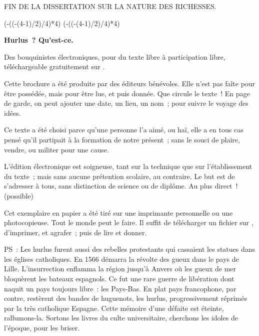 \documentclass[french,twoside]{book} %
\newcommand\chapterclose{} %
\def\truncdiv#1#2{((#1-(#2-1)/2)/#2)}
\def\moduloop#1#2{(#1-\truncdiv{#1}{#2}*#2)}
\def\modulo#1#2{\number\numexpr\moduloop{#1}{#2}\relax}
\begin{document}
\begin{raggedleft}FIN DE LA DISSERTATION SUR LA NATURE DES RICHESSES.\end{raggedleft}
\chapterclose

 


\ifbooklet
  \pagestyle{empty}
  \clearpage
  \ifnum\modulo{\value{page}}{4}=0 \hbox{}\newpage\hbox{}\newpage\fi
  \ifnum\modulo{\value{page}}{4}=1 \hbox{}\newpage\hbox{}\newpage\fi


  \hbox{}\newpage
  \ifodd\value{page}\hbox{}\newpage\fi
  {\centering\color{rubric}\bfseries\noindent\large
    Hurlus ? Qu’est-ce.\par
    \bigskip
  }
  \noindent Des bouquinistes électroniques, pour du texte libre à participation libre,
  téléchargeable gratuitement sur \href{https://hurlus.fr}{}.\par
  \bigskip
  \noindent Cette brochure a été produite par des éditeurs bénévoles.
  Elle n’est pas faîte pour être possédée, mais pour être lue, et puis donnée.
  Que circule le texte !
  En page de garde, on peut ajouter une date, un lieu, un nom ; pour suivre le voyage des idées.
  \par

  Ce texte a été choisi parce qu’une personne l’a aimé,
  ou haï, elle a en tous cas pensé qu’il partipait à la formation de notre présent ;
  sans le souci de plaire, vendre, ou militer pour une cause.
  \par

  L’édition électronique est soigneuse, tant sur la technique
  que sur l’établissement du texte ; mais sans aucune prétention scolaire, au contraire.
  Le but est de s’adresser à tous, sans distinction de science ou de diplôme.
  Au plus direct ! (possible)
  \par

  Cet exemplaire en papier a été tiré sur une imprimante personnelle
   ou une photocopieuse. Tout le monde peut le faire.
  Il suffit de
  télécharger un fichier sur \href{https://hurlus.fr}{},
  d’imprimer, et agrafer ; puis de lire et donner.\par

  \bigskip

  \noindent PS : Les hurlus furent aussi des rebelles protestants qui cassaient les statues dans les églises catholiques. En 1566 démarra la révolte des gueux dans le pays de Lille. L’insurrection enflamma la région jusqu’à Anvers où les gueux de mer bloquèrent les bateaux espagnols.
  Ce fut une rare guerre de libération dont naquit un pays toujours libre : les Pays-Bas.
  En plat pays francophone, par contre, restèrent des bandes de huguenots, les hurlus, progressivement réprimés par la très catholique Espagne.
  Cette mémoire d’une défaite est éteinte, rallumons-la. Sortons les livres du culte universitaire, cherchons les idoles de l’époque, pour les briser.
\fi
\end{document}
